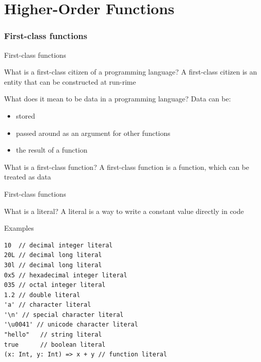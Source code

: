 \part[Higher-Order Functions]{Higher-Order Functions}
\section{First-class functions}
\begin{frame}{First-class functions}
\begin{block}{What is a first-class citizen of a programming language?}
\pause
A first-class citizen is an entity that can be constructed at run-rime\\
\end{block}
\pause
\begin{center}
\end{center}
\pause
\begin{block}{What does it mean to be data in a programming language?}
\pause
Data can be:
\begin{itemize}
  \item stored
  \item passed around as an argument for other functions
  \item the result of a function
\end{itemize}
\end{block}
\pause
\begin{block}{What is a first-class function?}
A first-class function is a function, which can be treated as data
\end{block}
\end{frame}

\begin{frame}[fragile]{First-class functions}
\begin{block}{What is a literal?}
\pause
A literal is a way to write a constant value directly in code
\end{block}
\pause
\begin{exampleblock}{Examples}
\begin{lstlisting}
10  // decimal integer literal
20L // decimal long literal
30l // decimal long literal
0x5 // hexadecimal integer literal
035 // octal integer literal
1.2 // double literal
'a' // character literal
'\n' // special character literal
'\u0041' // unicode character literal
"hello"   // string literal
true      // boolean literal
(x: Int, y: Int) => x + y // function literal
\end{lstlisting}
\end{exampleblock}
\end{frame}

